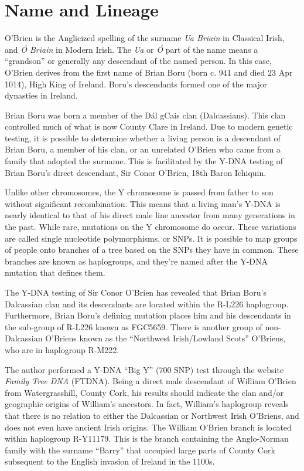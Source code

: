 \chapter{Name and Lineage}

O'Brien is the Anglicized spelling of the surname \textit{Ua Briain} in Classical Irish, and \textit{\'{O} Briain} in Modern Irish. The \textit{Ua} or \textit{\'{O}} part of the name means a ``grandson'' or generally any descendant of the named person. In this case, O'Brien derives from the first name of Brian Boru (born c. 941 and died 23 Apr 1014), High King of Ireland. Boru's descendants formed one of the major dynasties in Ireland.\cite{BoruHistorical}

Brian Boru was born a member of the D\'{a}l gCais clan (Dalcassians). This clan controlled much of what is now County Clare in Ireland.\cite{BoruEarlyHistory} Due to modern genetic testing, it is possible to determine whether a living person is a descendant of Brian Boru, a member of his clan, or an unrelated O'Brien who came from a family that adopted the surname. This is facilitated by the Y-DNA testing of Brian Boru's direct descendant, Sir Conor O'Brien, 18th Baron Ichiquin.\cite{GGI}

Unlike other chromosomes, the Y chromosome is passed from father to son without significant recombination. This means that a living man's Y-DNA is nearly identical to that of his direct male line ancestor from many generations in the past. While rare, mutations on the Y chromosome do occur. These variations are called single nucleotide polymorphisms, or SNPs. It is possible to map groups of people onto branches of a tree based on the SNPs they have in common. These branches are known as haplogroups, and they're named after the Y-DNA mutation that defines them.\cite{Bettinger}

The Y-DNA testing of Sir Conor O'Brien has revealed that Brian Boru's Dalcassian clan and its descendants are located within the R-L226 haplogroup. Furthermore, Brian Boru's defining mutation places him and his descendants in the sub-group of R-L226 known as FGC5659. There is another group of non-Dalcassian O'Briens known as the ``Northwest Irish/Lowland Scots'' O'Briens, who are in haplogroup R-M222.\cite{GGI}

The author performed a Y-DNA ``Big Y'' (700 SNP) test through the website \textit{Family Tree DNA} (FTDNA). Being a direct male descendant of William O'Brien from Watergrasshill, County Cork, his results should indicate the clan and/or geographic origins of William's ancestors. In fact, William's haplogroup reveals that there is no relation to either the Dalcassian or Northwest Irish O'Briens, and does not even have ancient Irish origins. The William O'Brien branch is located within haplogroup R-Y11179. This is the branch containing the Anglo-Norman family with the surname ``Barry'' that occupied large parts of County Cork subsequent to the English invasion of Ireland in the 1100s.\cite{JamesBarry1,BigY}

